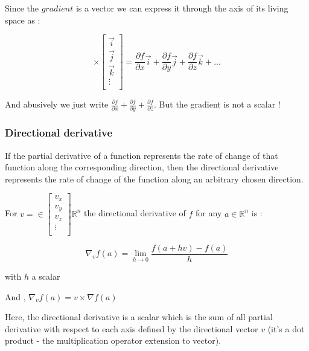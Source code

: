 \documentclass[12pt]{article}
\begin{document}
Since the $gradient$ is a vector we can express it through the axis of its living space as :

\begin{equation*}
[\frac{\partial{f}}{\partial{x}}, \frac{\partial{f}}{\partial{y}}, \frac{\partial{f}}{\partial{z}},...] 
\times
\begin{bmatrix}
    \vec{i} \\
    \vec{j} \\
    \vec{k} \\
    \vdots \\
\end{bmatrix}
= \frac{\partial{f}}{\partial{x}}\vec{i} + \frac{\partial{f}}{\partial{y}}\vec{j} + \frac{\partial{f}}{\partial{z}}\vec{k} + ...
\end{equation*}

And abusively we just write $\frac{\partial{f}}{\partial{x}} + \frac{\partial{f}}{\partial{y}} + \frac{\partial{f}}{\partial{z}}$. But the gradient is not a scalar !


\subsubsection{Directional derivative}

If the partial derivative of a function represents the rate of change of that function along the corresponding direction, then the directional derivative \cite{youtube_khanAcademy_directional_derivative} represents the rate of change of the function along an arbitrary chosen direction.

For 
$v= \in \begin{bmatrix}
    v_x \\
    v_y \\
    v_z \\
    \vdots \\
\end{bmatrix} \mathbb{R}^n$ 
the directional derivative of $f$ for any $a \in \mathbb{R}^n$ is :

$$
\nabla_{v}f(a) = \lim_{h \rightarrow 0} \frac{f(a+hv)-f(a)}{h}
$$

with $h$ a scalar

And \cite{wiki_directionnal_deirvative}, $\nabla_{v}f(a) = v \times \nabla f(a)$

Here, the directional derivative is a scalar which is the sum of all partial derivative with respect to each axis defined by the directional vector $v$ (it's a dot product - the multiplication operator extension to vector).
\end{document}
